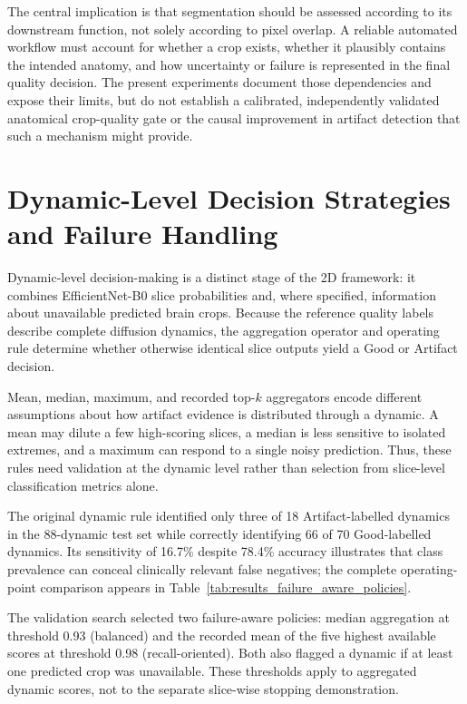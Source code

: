 The central implication is that segmentation should be assessed according to its downstream function, not solely according to pixel overlap. A reliable automated workflow must account for whether a crop exists, whether it plausibly contains the intended anatomy, and how uncertainty or failure is represented in the final quality decision. The present experiments document those dependencies and expose their limits, but do not establish a calibrated, independently validated anatomical crop-quality gate or the causal improvement in artifact detection that such a mechanism might provide.

\section{Dynamic-Level Decision Strategies and Failure Handling}
\label{sec:discussion_dynamic_decisions}

Dynamic-level decision-making is a distinct stage of the 2D framework: it combines EfficientNet-B0 slice probabilities and, where specified, information about unavailable predicted brain crops. Because the reference quality labels describe complete diffusion dynamics, the aggregation operator and operating rule determine whether otherwise identical slice outputs yield a Good or Artifact decision.

Mean, median, maximum, and recorded top-$k$ aggregators encode different assumptions about how artifact evidence is distributed through a dynamic. A mean may dilute a few high-scoring slices, a median is less sensitive to isolated extremes, and a maximum can respond to a single noisy prediction. Thus, these rules need validation at the dynamic level rather than selection from slice-level classification metrics alone.

The original dynamic rule identified only three of 18 Artifact-labelled dynamics in the 88-dynamic test set while correctly identifying 66 of 70 Good-labelled dynamics. Its sensitivity of 16.7\% despite 78.4\% accuracy illustrates that class prevalence can conceal clinically relevant false negatives; the complete operating-point comparison appears in Table~\ref{tab:results_failure_aware_policies}.

The validation search selected two failure-aware policies: median aggregation at threshold 0.93 (balanced) and the recorded mean of the five highest available scores at threshold 0.98 (recall-oriented). Both also flagged a dynamic if at least one predicted crop was unavailable. These thresholds apply to aggregated dynamic scores, not to the separate slice-wise stopping demonstration.

